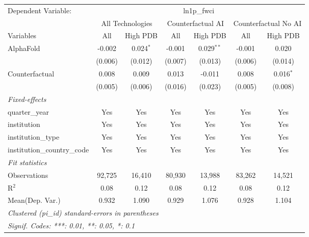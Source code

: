 \begingroup
\centering
\begin{tabular}{lcccccc}
   \tabularnewline \midrule \midrule
   Dependent Variable: & \multicolumn{6}{c}{ln1p\_fwci}\\
 & \multicolumn{2}{c}{All Technologies} & \multicolumn{2}{c}{Counterfactual AI} & \multicolumn{2}{c}{Counterfactual No AI} \\
\cmidrule(lr){1-1}\cmidrule(lr){2-3} \cmidrule(lr){4-5} \cmidrule(lr){6-7}
Variables & \multicolumn{1}{c}{All} & \multicolumn{1}{c}{High PDB} & \multicolumn{1}{c}{All} & \multicolumn{1}{c}{High PDB} & \multicolumn{1}{c}{All} & \multicolumn{1}{c}{High PDB} \\
\cmidrule(lr){1-1}\cmidrule(lr){2-2} \cmidrule(lr){3-3} \cmidrule(lr){4-4} \cmidrule(lr){5-5} \cmidrule(lr){6-6} \cmidrule(lr){7-7}
   AlphaFold                    & -0.002  & 0.024$^{*}$ & -0.001  & 0.029$^{**}$ & -0.001  & 0.020\\   
                                & (0.006) & (0.012)     & (0.007) & (0.013)      & (0.006) & (0.014)\\   
   Counterfactual               & 0.008   & 0.009       & 0.013   & -0.011       & 0.008   & 0.016$^{*}$\\   
                                & (0.005) & (0.006)     & (0.016) & (0.023)      & (0.005) & (0.008)\\   
   \midrule
   \emph{Fixed-effects}\\
   quarter\_year                & Yes     & Yes         & Yes     & Yes          & Yes     & Yes\\  
   institution                  & Yes     & Yes         & Yes     & Yes          & Yes     & Yes\\  
   institution\_type            & Yes     & Yes         & Yes     & Yes          & Yes     & Yes\\  
   institution\_country\_code   & Yes     & Yes         & Yes     & Yes          & Yes     & Yes\\  
   \midrule
   \emph{Fit statistics}\\
   Observations                 & 92,725  & 16,410      & 80,930  & 13,988       & 83,262  & 14,521\\  
   R$^2$                        & 0.08    & 0.12        & 0.08    & 0.12         & 0.08    & 0.12\\  
Mean(Dep. Var.) & 0.932 & 1.090 & 0.929 & 1.076 & 0.928 & 1.104 \\
   \midrule \midrule
   \multicolumn{7}{l}{\emph{Clustered (pi\_id) standard-errors in parentheses}}\\
   \multicolumn{7}{l}{\emph{Signif. Codes: ***: 0.01, **: 0.05, *: 0.1}}\\
\end{tabular}
\par\endgroup
